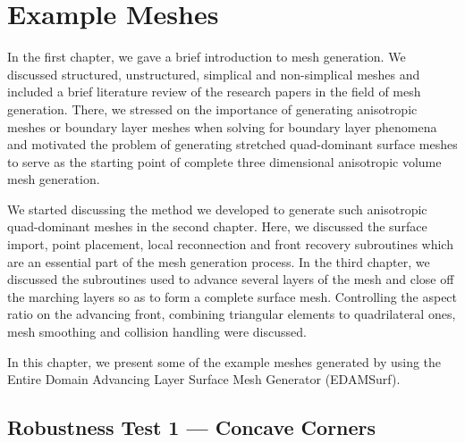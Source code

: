 \chapter{Example Meshes}

In the first chapter, we gave a brief introduction to mesh generation. We discussed structured, unstructured, simplical and non-simplical meshes and included a brief literature review of the research papers in the field of mesh generation. There, we stressed on the importance of generating anisotropic meshes or boundary layer meshes when solving for boundary layer phenomena and motivated the problem of generating stretched quad-dominant surface meshes to serve as the starting point of complete three dimensional anisotropic volume mesh generation.

We started discussing the method we developed to generate such anisotropic quad-dominant meshes in the second chapter. Here, we discussed the surface import, point placement, local reconnection and front recovery subroutines which are an essential part of the mesh generation process. In the third chapter, we discussed the subroutines used to advance several layers of the mesh and close off the marching layers so as to form a complete surface mesh. Controlling the aspect ratio on the advancing front, combining triangular elements to quadrilateral ones, mesh smoothing and collision handling were discussed.

In this chapter, we present some of the example meshes generated by using the Entire Domain Advancing Layer Surface Mesh Generator (EDAMSurf).


\section{Robustness Test 1 --- Concave Corners}

